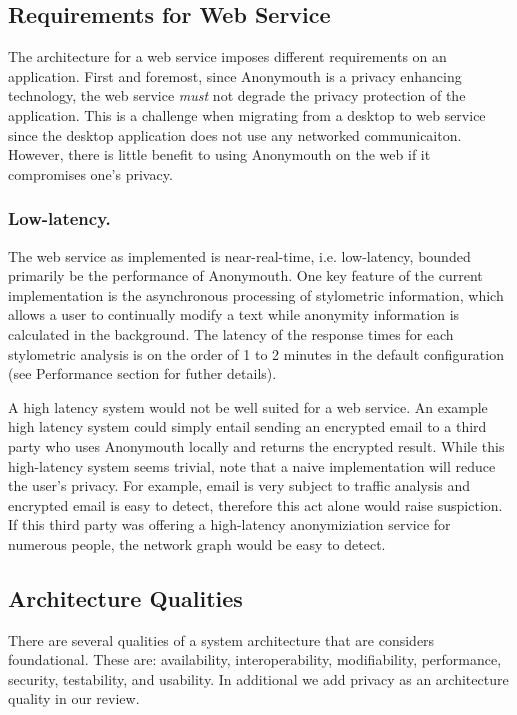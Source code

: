 \documentclass[letterpaper]{article}
\begin{document}
\subsection{Requirements for Web Service}

The architecture for a web service imposes different requirements on
an application.  First and foremost, since Anonymouth is a privacy
enhancing technology, the web service \emph{must} not degrade the
privacy protection of the application.  This is a challenge when
migrating from a desktop to web service since the desktop application
does not use any networked communicaiton.  However, there is little
benefit to using Anonymouth on the web if it compromises one's
privacy.

\subsubsection{Low-latency.}
The web service as implemented is near-real-time, i.e. low-latency,
bounded primarily be the performance of Anonymouth. One key feature of
the current implementation is the asynchronous processing of
stylometric information, which allows a user to continually modify a
text while anonymity information is calculated in the background. The
latency of the response times for each stylometric analysis is on the
order of 1 to 2 minutes in the default configuration (see Performance
section for futher details).

A high latency system would not be well suited for a web service.  An
example high latency system could simply entail sending an encrypted
email to a third party who uses Anonymouth locally and returns the
encrypted result.  While this high-latency system seems trivial, note
that a naive implementation will reduce the user's privacy.  For
example, email is very subject to traffic analysis
\cite{Mathewson04practicaltraffic} and encrypted email is easy to
detect, therefore this act alone would raise suspiction.  If
this third party was offering a high-latency anonymiziation service
for numerous people, the network graph would be easy to detect.

\subsection{Architecture Qualities}
There are several qualities of a system architecture that are
considers foundational\cite{Bass:2012:SAP:2392670}.  These are: availability,
interoperability, modifiability, performance, security, testability,
and usability.  In additional we add privacy as an architecture
quality in our review.
\end{document}
